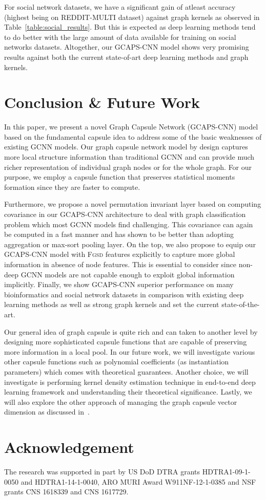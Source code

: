 \documentclass{article}
\begin{document}
For social network datasets, we have a significant gain of atleast  accuracy (highest being on REDDIT-MULTI dataset) against graph kernels as observed in  Table~\ref{table:social_results}. But this is expected as deep learning methods tend to do better with the large amount of data available for training on social networks datasets. Altogether, our GCAPS-CNN model shows very promising results against both  the current state-of-art  deep learning methods and graph kernels.  








\section{Conclusion \& Future Work }

In this paper, we present a novel    Graph Capsule Network (GCAPS-CNN)  model based on the fundamental capsule idea to address some of the basic weaknesses of existing GCNN models. Our graph capsule network model by design   captures more local structure information than traditional GCNN and can   provide much richer representation of individual graph nodes or for the whole graph. For our purpose, we employ a capsule function that preserves statistical moments formation  since they are faster to compute. 

Furthermore, we propose a novel permutation invariant layer based on computing covariance in our GCAPS-CNN architecture to deal with graph classification problem which most GCNN models find  challenging. This covariance can again be computed in a fast manner and has   shown to be better than adopting aggregation or max-sort pooling layer. On the top, we also propose to equip our GCAPS-CNN model with  \textsc{Fgsd} features explicitly  to capture more global information in absence of node features. This is essential   to consider since non-deep GCNN models are not capable enough to exploit global information implicitly.  Finally, we show   GCAPS-CNN   superior performance on many bioinformatics and social network datasets in comparison with  existing   deep learning methods as well as strong graph kernels   and set the current state-of-the-art.

Our general idea of graph capsule is quite rich and can taken to another level by designing  more sophisticated capsule functions that are capable of preserving more information in a local pool. In our future work, we will investigate  various other capsule functions such as  polynomial coefficients (as instantiation parameters)  which comes with theoretical guarantees. Another choice, we will investigate is performing  kernel density estimation technique  in end-to-end deep learning framework  and understanding their   theoretical significance. Lastly, we will also explore the other approach of managing the graph capsule vector dimension as discussed in~\cite{sabour2017dynamic}.

\section*{Acknowledgement}
The research was supported in part by  US DoD DTRA grants HDTRA1-09-1-0050
and HDTRA1-14-1-0040, ARO MURI Award W911NF-12-1-0385 and NSF grants CNS 1618339
and CNS 1617729. 



\end{document}
